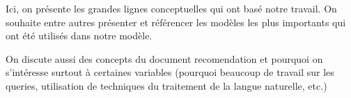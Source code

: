 Ici, on présente les grandes lignes conceptuelles qui ont basé notre travail.
On souhaite entre autres présenter et référencer les modèles les plus importants qui ont été utilisés dans notre modèle.

On discute aussi des concepts du document recomendation et pourquoi on s'intéresse surtout à certaines variables (pourquoi beaucoup de travail sur les queries, utilisation de techniques du traitement de la langue naturelle, etc.)